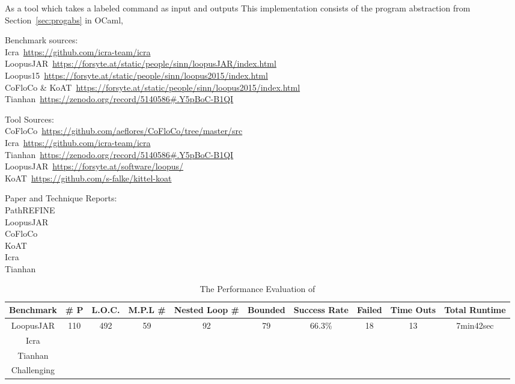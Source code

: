 As a tool which takes a labeled command as input  
and outputs 
This implementation consists of the 
program abstraction from Section~\ref{sec:progabs} in OCaml,

Benchmark sources:
\\
Icra~\hyperlink{Icra}{https://github.com/icra-team/icra}
\\
LoopusJAR~\hyperlink{LoopusJAR}{https://forsyte.at/static/people/sinn/loopusJAR/index.html}
\\
Loopus15~\hyperlink{Loopus15}{https://forsyte.at/static/people/sinn/loopus2015/index.html}
\\
CoFloCo \& KoAT~\hyperlink{CoFloCo \& KoAT}{https://forsyte.at/static/people/sinn/loopus2015/index.html}
\\
Tianhan~\hyperlink{Tianhan}{https://zenodo.org/record/5140586\#.Y5pBoC-B1QI}


Tool Sources:
\\
CoFloCo~\hyperlink{CoFloCo}{https://github.com/aeflores/CoFloCo/tree/master/src}
\\
Icra~\hyperlink{Icra}{https://github.com/icra-team/icra}
\\
Tianhan~\hyperlink{Tianhan}{https://zenodo.org/record/5140586\#.Y5pBoC-B1QI}
\\
LoopusJAR~\hyperlink{LoopusJAR}{https://forsyte.at/software/loopus/}
\\
KoAT~\hyperlink{KoAT}{https://github.com/s-falke/kittel-koat}

Paper and Technique Reports:
\\
PathREFINE~\cite{GulwaniJK09}
\\
LoopusJAR~\cite{sinn2017complexity}
\\
CoFloCo~\cite{Montoya17, Flores-Montoya16, Flores-MontoyaH14}
\\
KoAT~\cite{BrockschmidtEFFG14, FalkeKS12, FalkeKS11}
\\
Icra~\cite{KincaidBCR19, CyphertBKR19}
\\
Tianhan~\cite{LuCT21}


\begin{table}[H]
    \caption{The Performance Evaluation of {\THESYSTEM}}
    \label{tb:performance-eval}
    \centering
        {\small
        \begin{tabular}{ >{\small}c | c | c | c | c | c | c | c | c | c }
            Benchmark & \# P  & L.O.C. & M.P.L \# & Nested Loop \#  & Bounded & Success Rate & Failed & Time Outs  & Total Runtime \\
            \hline
            LoopusJAR & 110 & 492 & 59  & 92  & 79 & 66.3\% & 18 &  13 & 7min42sec \\
            \hline
            Icra & & & & & & & & \\
            \hline
            Tianhan & & & & & & & & \\
            \hline
            Challenging & & & & & & & & \\
            \hline
        \end{tabular}
        }
    \end{table}

